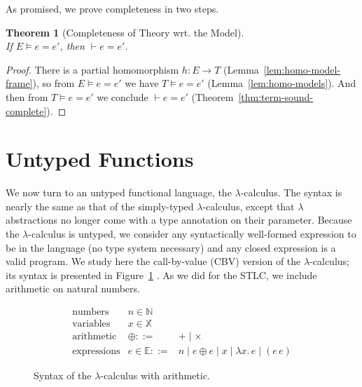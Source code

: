 \documentclass{tufte-handout}
\newcommand{\LAM}[1]{\lambda #1.\,}
\newcommand{\VAR}[0]{\mathbb{X}}
\newtheorem{theorem}{Theorem}%
\begin{document}
As promised, we prove completeness in two steps.

\begin{theorem}[Completeness of Theory wrt. the Model]\ \\
  If $E \models e = e'$, then $\vdash e = e'$.
\end{theorem}
\begin{proof}
  There is a partial homomorphism $h : E \to T$
  (Lemma~\ref{lem:homo-model-frame}), so from $E \models e = e'$ we
  have $T \models e = e'$ (Lemma~\ref{lem:homo-models}).  And then
  from $T \models e = e'$ we conclude $\vdash e = e'$
  (Theorem~\ref{thm:term-sound-complete}).
\end{proof}


\section{Untyped Functions}
\label{sec:lambda}


We now turn to an untyped functional language, the $\lambda$-calculus.
The syntax is nearly the same as that of the simply-typed
$\lambda$-calculus, except that $\lambda$ abstractions no longer come
with a type annotation on their parameter.  Because the
$\lambda$-calculus is untyped, we consider any syntactically
well-formed expression to be in the language (no type system
necessary) and any closed expression is a valid program.  We study
here the call-by-value (CBV) version of the $\lambda$-calculus; its
syntax is presented in Figure~\ref{fig:lambda-syntax} .  As we did for
the STLC, we include arithmetic on natural numbers.

\begin{figure}[tbp]
\[
\begin{array}{lrl}
 \text{numbers}   & n \in \mathbb{N} \\
 \text{variables} & x \in \VAR\\
 \text{arithmetic} & \oplus ::= & + \mid \times \\
 \text{expressions}& e \in\mathbb{E} ::=& n \mid e \oplus e \mid x \mid \LAM{x} e \mid (e \, e)
\end{array}
\]
\caption{Syntax of the $\lambda$-calculus with arithmetic.}
\label{fig:lambda-syntax}
\end{figure}
\end{document}

